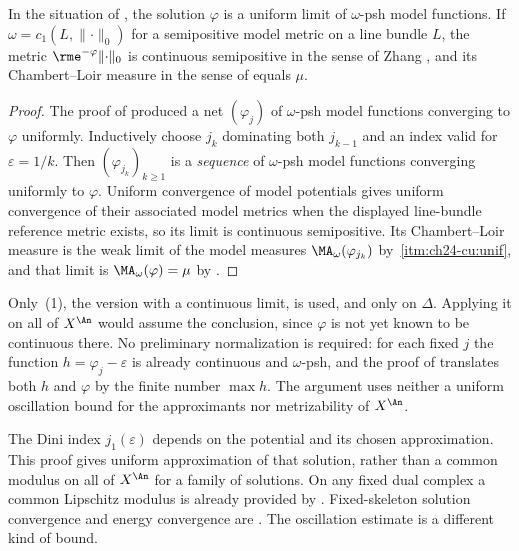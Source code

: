 \begin{corollary}
\label{cor:ch29-uniform-model-limit}
In the situation of , the solution
$\varphi$ is a uniform limit of $\omega$-psh model functions.
If $\omega=c_1(L,\lVert\cdot\rVert_0)$ for a semipositive model
metric on a line bundle $L$, the metric
$\rme^{-\varphi}\lVert\cdot\rVert_0$ is continuous semipositive in the
sense of Zhang
\cite{Zhang1995}, and its Chambert--Loir measure in the sense of
\cite{CL06} equals $\mu$.
\end{corollary}

\begin{proof}
The proof of  produced a net
$(\varphi_j)$ of $\omega$-psh model functions converging to
$\varphi$ uniformly.  Inductively choose $j_k$ dominating both $j_{k-1}$
and an index valid for $\varepsilon=1/k$.  Then
$(\varphi_{j_k})_{k\geq1}$ is a \emph{sequence} of $\omega$-psh model
functions converging uniformly to $\varphi$.  Uniform convergence of model
potentials gives uniform convergence of their associated model
metrics when the displayed line-bundle reference metric exists, so its
limit is continuous semipositive.  Its
Chambert--Loir measure is the weak limit of the model measures
$\MA_\omega(\varphi_{j_k})$ by
\,\cref{itm:ch24-cu:unif}, and that limit
is $\MA_\omega(\varphi)=\mu$ by .
\end{proof}

\begin{remark}
\label{rem:ch29-two-dinis}
Only \,(1), the version with a continuous limit, is
used, and only on $\Delta$.  Applying it on all of $X^{\An}$ would assume
the conclusion, since $\varphi$ is not yet known to be continuous there.
No preliminary normalization is required: for each fixed $j$ the function
$h=\varphi_j-\varepsilon$ is already continuous and $\omega$-psh, and the
proof of  translates both $h$ and
$\varphi$ by the finite number $\max h$.  The argument uses neither a
uniform oscillation bound for the approximants nor metrizability of
$X^{\An}$.
\end{remark}

\begin{remark}
\label{rem:ch29-one-measure}
The Dini index $j_1(\varepsilon)$ depends on the potential and its chosen
approximation.  This proof gives uniform approximation of that solution,
rather than a common modulus on all of $X^{\An}$ for a family of solutions.
On any fixed dual complex a common Lipschitz modulus is already provided
by .  Fixed-skeleton solution convergence
and energy convergence are .
The oscillation estimate  is a different
kind of bound.
\end{remark}

